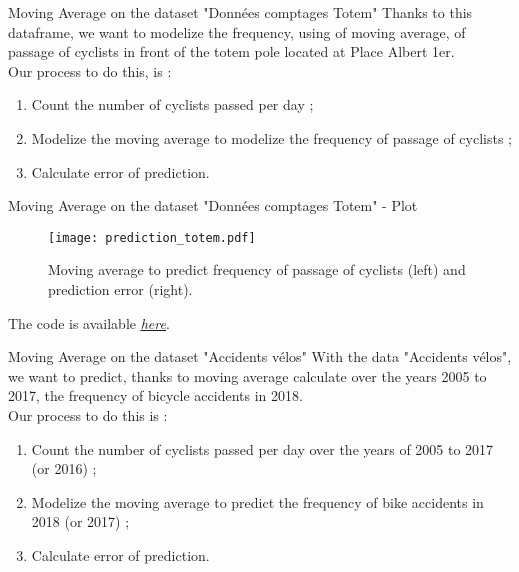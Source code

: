\documentclass[unknownkeysallowed]{beamer}
\begin{document}
\begin{frame}{Moving Average on the dataset "Données comptages Totem"}
Thanks to this dataframe, we want to modelize the frequency, using of moving average, of passage of cyclists in front of the totem pole located at Place Albert 1er. \\
Our process to do this, is : 
\begin{enumerate}
    \item Count the number of cyclists passed per day ;
    \item Modelize the moving average to modelize the frequency of passage of cyclists ;
    \item Calculate error of prediction.
\end{enumerate}
\end{frame}
 \begin{frame}{Moving Average on the dataset "Données comptages Totem" - Plot}
\begin{figure}[!h]
     \begin{center}
   \caption{\label{étiquette}Moving average to predict frequency of passage of cyclists (left) and prediction error (right).}
   \texttt{[image: prediction\_totem.pdf]}
   \end{center}
    \end{figure}
The code is available \href{https://github.com/Cindy-dotcom1/MLA/blob/master/Notebooks/Moving_Average_Totem.ipynb}{\textit{\underline{here}}}.
 \end{frame}
 \begin{frame}{Moving Average on the dataset "Accidents vélos"}
With the data "Accidents vélos", we want to predict, thanks to moving average calculate over the years 2005 to 2017, the frequency of 
bicycle accidents in 2018. \\
Our process to do this is : 
\begin{enumerate}
    \item Count the number of cyclists passed per day over the years of 2005 to 2017 (or 2016) ;
    \item Modelize the moving average to predict the frequency of bike accidents in 2018 (or 2017) ;
    \item Calculate error of prediction.
\end{enumerate}
\end{frame}
\end{document}
